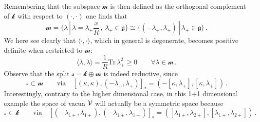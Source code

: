 \documentclass[11pt,a4paper]{article}
\def\calsk{\boldsymbol{\mathscr k}}
\def\calsm{{\boldsymbol{\mathscr m}}}
\def\calss{{\boldsymbol{\mathscr s}}}
\def\calv{{\cal V}}
\def\Tr{\mathrm{Tr}}
\begin{document}
    Remembering that the subspace $\calsm$ is then defined as the orthogonal complement of $\calsk$ with respect to $(\cdot,\cdot)$ one finds that
    \begin{equation}
    \calsm=\{ \lambda\,|\, \lambda=\lambda_+\frac{x}{R}\,,\ \lambda_+\in\mathfrak{g}\}\cong \{(-\lambda_+,\lambda_+)\,|\,\lambda_+\in\mathfrak{g}\}\,.
    \end{equation}
    We here see clearly that $\langle\cdot,\cdot\rangle$, which in general is degenerate, becomes positive definite when restricted to $\calsm$:
    \begin{equation}
    \langle\lambda,\lambda\rangle=\frac{1}{R}\Tr\,\lambda_+^2\geq 0\qquad \forall\lambda\in\calsm\,.
    \end{equation}
    Observe that the split $\calss=\calsk\oplus\calsm$ is indeed reductive, since
    \begin{equation}
    [\calsk,\calsm]_*\subset\calsm\qquad\mbox{via}\quad [(\kappa,\kappa),(-\lambda_+,\lambda_+)]_*=(-[\kappa,\lambda_+],[\kappa,\lambda_+])\,.
    \end{equation}
    Interestingly, contrary to the higher dimensional case, in this 1+1 dimensional example the space of vacua $\calv$ will actually be a symmetric space because
    \begin{equation}
    [\calsm,\calsm]_*\subset\calsk\qquad\mbox{via}\quad [(-\lambda_{1+},\lambda_{1+}),(-\lambda_{1+},\lambda_{1+})]_*=([\lambda_{1+},\lambda_{2+}],[\lambda_{1+},\lambda_{2+}])\,.
    \end{equation}
    
\end{document}
